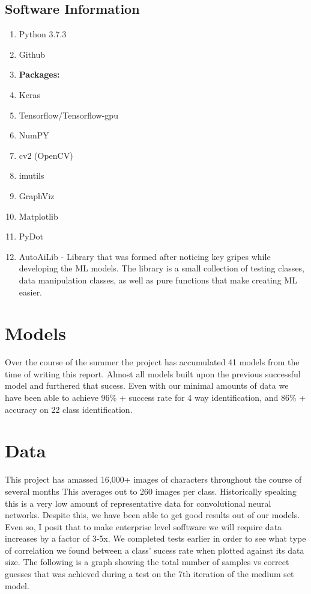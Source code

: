 \documentclass[12pt]{article} %
\begin{document}
\subsection{Software Information}
\begin{enumerate}[label = (\roman*)]
\item Python 3.7.3
\item Github
\item \textbf{Packages:}
\item Keras
\item Tensorflow/Tensorflow-gpu
\item NumPY
\item cv2 (OpenCV)
\item imutils
\item GraphViz
\item Matplotlib
\item PyDot
\item AutoAiLib - Library that was formed after noticing key gripes while developing the ML models. The library is a small collection of testing classes, data manipulation classes, as well as pure functions that make creating ML easier.
\end{enumerate}

\section{Models}
Over the course of the summer the project has accumulated 41 models from the time of writing this report. Almost all models built upon the previous successful model and furthered that sucess. Even with our minimal amounts of data we have been able to achieve 96\% + success rate for 4 way identification, and 86\% + accuracy on 22 class identification.


\section{Data}
This project has amassed 16,000+ images of characters throughout the course of several months This averages out to 260 images per class. Historically speaking this is a very low amount of representative data for convolutional neural networks. Despite this, we have been able to get good results out of our models. Even so, I posit that to make enterprise level sofftware we will require data increases by a factor of 3-5x. We completed tests earlier in order to see what type of correlation we found between a class' sucess rate when plotted against its data size.
The following is a graph showing the total number of samples vs correct guesses that was achieved during a test on the 7th iteration of the medium set model.
\end{document}
